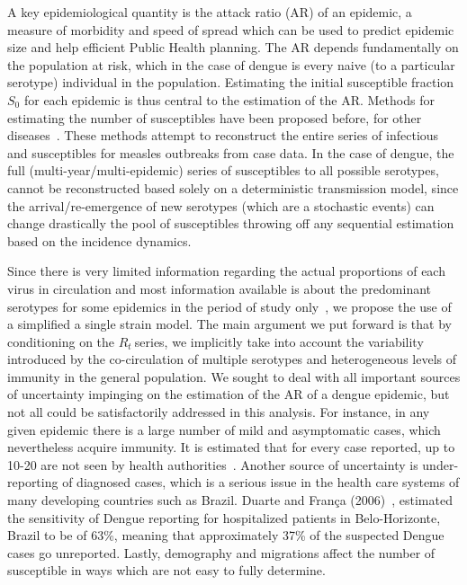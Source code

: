 \documentclass[10pt]{article}
\def \rr {$R_{t}\:$}
\begin{document}
A key epidemiological quantity is the attack ratio (AR) of an epidemic, a 
measure of morbidity and speed of spread which can be used to predict epidemic 
size and help efficient Public Health planning.
The AR depends fundamentally on the population at risk, which in the case of 
dengue is every naive (to a particular serotype) individual in the population.
Estimating the initial susceptible fraction $S_0$ for each epidemic is thus 
central to the estimation of the AR.
Methods for estimating the  number of susceptibles have been proposed 
before, for other diseases~\citep{bjornstad_dynamics_2002, 
wallinga_reconstruction_2003}.
These methods attempt to reconstruct the entire 
series of infectious and susceptibles for measles 
outbreaks from case data.
In the case of dengue, the full (multi-year/multi-epidemic)
series of susceptibles to all possible serotypes, cannot be reconstructed based 
solely on a deterministic transmission model, since the arrival/re-emergence of 
new serotypes (which are a stochastic events) can change drastically the pool 
of susceptibles throwing off any sequential estimation based on the incidence
dynamics.

Since there is very limited information regarding the actual proportions of 
each virus in circulation and most information available is about the 
predominant serotypes for some epidemics in the period of 
study only~\citep{macedo_virological_2013}, we propose the use of a 
simplified a single strain model.
The main argument we put forward is that by conditioning on the \rr series, we 
implicitly take into account the variability introduced by the 
co-circulation of multiple serotypes and heterogeneous levels of immunity in 
the general population.
We sought to deal with all important sources of uncertainty impinging on the 
estimation of the AR of a dengue epidemic, but not all could be satisfactorily 
addressed in this analysis.
For instance, in any given epidemic there is a large number of 
mild and asymptomatic cases, which nevertheless acquire immunity.
It is estimated that for every case reported, up to 10-20 are not seen by 
health 
authorities~\citep{luz_disability_2009}.
Another source of uncertainty is under-reporting of diagnosed cases, which is a 
serious issue in the health care systems of many developing countries such as 
Brazil. 
Duarte and Fran\c{c}a (2006)~\citep{duarte_data_2006}, estimated 
the sensitivity of Dengue reporting for hospitalized patients in 
Belo-Horizonte, Brazil to be of 63\%, meaning that approximately 37\% of the 
suspected Dengue cases go unreported.  
Lastly, demography and migrations affect the number of susceptible in ways 
which are not easy to fully determine.
\end{document}
